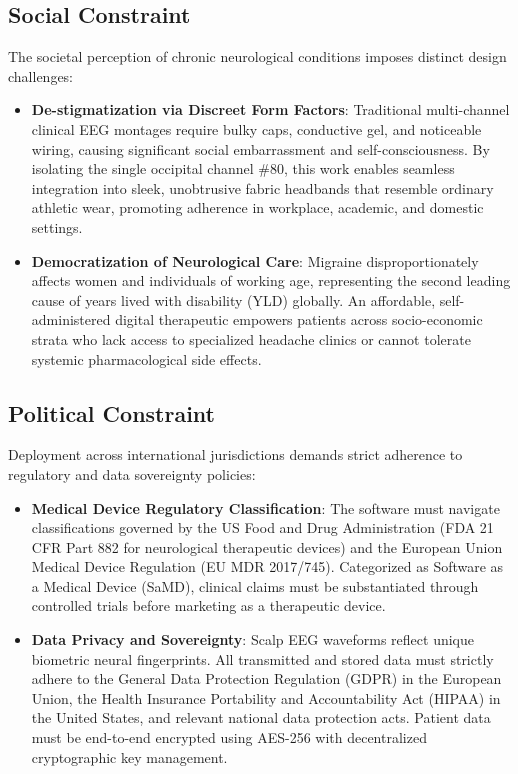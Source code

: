 \documentclass[12pt, a4paper]{report}
\begin{document}
    \subsection{Social Constraint}
    The societal perception of chronic neurological conditions imposes distinct design challenges:
    \begin{itemize}
        \item \textbf{De-stigmatization via Discreet Form Factors}: Traditional multi-channel clinical EEG montages require bulky caps, conductive gel, and noticeable wiring, causing significant social embarrassment and self-consciousness. By isolating the single occipital channel \#80, this work enables seamless integration into sleek, unobtrusive fabric headbands that resemble ordinary athletic wear, promoting adherence in workplace, academic, and domestic settings.
        \item \textbf{Democratization of Neurological Care}: Migraine disproportionately affects women and individuals of working age, representing the second leading cause of years lived with disability (YLD) globally. An affordable, self-administered digital therapeutic empowers patients across socio-economic strata who lack access to specialized headache clinics or cannot tolerate systemic pharmacological side effects.
    \end{itemize}

    \subsection{Political Constraint}
    Deployment across international jurisdictions demands strict adherence to regulatory and data sovereignty policies:
    \begin{itemize}
        \item \textbf{Medical Device Regulatory Classification}: The software must navigate classifications governed by the US Food and Drug Administration (FDA 21 CFR Part 882 for neurological therapeutic devices) and the European Union Medical Device Regulation (EU MDR 2017/745). Categorized as Software as a Medical Device (SaMD), clinical claims must be substantiated through controlled trials before marketing as a therapeutic device.
        \item \textbf{Data Privacy and Sovereignty}: Scalp EEG waveforms reflect unique biometric neural fingerprints. All transmitted and stored data must strictly adhere to the General Data Protection Regulation (GDPR) in the European Union, the Health Insurance Portability and Accountability Act (HIPAA) in the United States, and relevant national data protection acts. Patient data must be end-to-end encrypted using AES-256 with decentralized cryptographic key management.
    \end{itemize}
\end{document}
